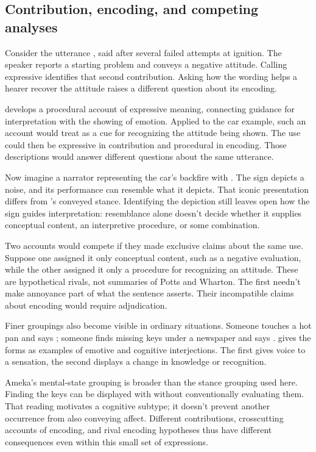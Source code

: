\documentclass[12pt]{article}
\begin{document}
\subsection{Contribution, encoding, and competing analyses}\label{sec:encoding}

Consider the utterance ,
said after several failed attempts at ignition. The speaker reports a
starting problem and conveys a negative attitude. Calling 
expressive identifies that second contribution. Asking how the wording
helps a hearer recover the attitude raises a different question about
its encoding.

\textcite{wharton2016expressives} develops a procedural account of expressive
meaning, connecting guidance for interpretation with the showing of emotion.
Applied to the car example, such an account would treat 
as a cue for recognizing the attitude being shown. The use could then
be expressive in contribution and procedural in encoding. Those descriptions
would answer different questions about the same utterance.

Now imagine a narrator representing the car's backfire with .
The sign depicts a noise, and its performance can resemble what it
depicts. That iconic presentation differs from 's conveyed
stance. Identifying the depiction still leaves open how the sign guides
interpretation: resemblance alone doesn't decide whether it supplies
conceptual content, an interpretive procedure, or some combination.

Two accounts would compete if they made exclusive claims
about the same  use. Suppose one assigned it only
conceptual content, such as a negative evaluation, while the other
assigned it only a procedure for recognizing an attitude. These are
hypothetical rivals, not summaries of Potts and Wharton. The first
needn't make annoyance part of what the sentence asserts. Their
incompatible claims about encoding would require adjudication.

Finer groupings also become visible in ordinary situations. Someone
touches a hot pan and says ; someone finds missing keys
under a newspaper and says .
\textcite[113]{ameka1992} gives the forms as examples of emotive and
cognitive interjections. The first gives voice to a sensation, the
second displays a change in knowledge or recognition.

Ameka's mental-state grouping is broader than the stance grouping used
here. Finding the keys can be displayed with  without
conventionally evaluating them. That reading motivates a cognitive subtype;
it doesn't prevent another occurrence from also conveying affect.
Different contributions, crosscutting accounts of encoding, and rival
encoding hypotheses thus have different consequences even within this
small set of expressions.
\end{document}
